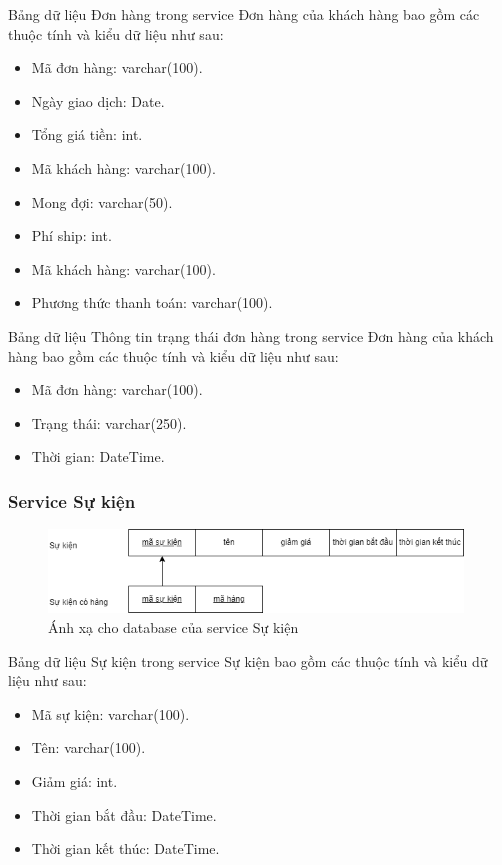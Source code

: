 Bảng dữ liệu Đơn hàng trong service Đơn hàng của khách hàng bao gồm các thuộc tính và kiểu dữ liệu như sau:
\begin{itemize}
	\item Mã đơn hàng: varchar(100).
	\item Ngày giao dịch: Date.
	\item Tổng giá tiền: int.
	\item Mã khách hàng: varchar(100).
	\item Mong đợi: varchar(50).
	\item Phí ship: int.
	\item Mã khách hàng: varchar(100).
	\item Phương thức thanh toán: varchar(100).
\end{itemize}

Bảng dữ liệu Thông tin trạng thái đơn hàng trong service Đơn hàng của khách hàng bao gồm các thuộc tính và kiểu dữ liệu như sau:
\begin{itemize}
	\item Mã đơn hàng: varchar(100).
	\item Trạng thái: varchar(250).
	\item Thời gian: DateTime.
\end{itemize}

\subsubsection{Service Sự kiện}
\begin{figure}[!htp]
	\begin{center}
		\includegraphics[width=11cm]{img/database/mapping/mapping-event.png}
		\newline
		\caption{Ánh xạ cho database của service Sự kiện}
	\end{center}
\end{figure}

Bảng dữ liệu Sự kiện trong service Sự kiện bao gồm các thuộc tính và kiểu dữ liệu như sau:
\begin{itemize}
	\item Mã sự kiện: varchar(100).
	\item Tên: varchar(100).
	\item Giảm giá: int.
	\item Thời gian bắt đầu: DateTime.
	\item Thời gian kết thúc: DateTime.
\end{itemize}


